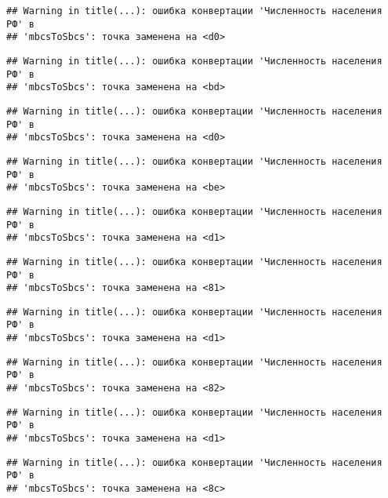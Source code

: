 \documentclass[
]{article}
\begin{document}
\begin{verbatim}
## Warning in title(...): ошибка конвертации 'Численность населения РФ' в
## 'mbcsToSbcs': точка заменена на <d0>
\end{verbatim}

\begin{verbatim}
## Warning in title(...): ошибка конвертации 'Численность населения РФ' в
## 'mbcsToSbcs': точка заменена на <bd>
\end{verbatim}

\begin{verbatim}
## Warning in title(...): ошибка конвертации 'Численность населения РФ' в
## 'mbcsToSbcs': точка заменена на <d0>
\end{verbatim}

\begin{verbatim}
## Warning in title(...): ошибка конвертации 'Численность населения РФ' в
## 'mbcsToSbcs': точка заменена на <be>
\end{verbatim}

\begin{verbatim}
## Warning in title(...): ошибка конвертации 'Численность населения РФ' в
## 'mbcsToSbcs': точка заменена на <d1>
\end{verbatim}

\begin{verbatim}
## Warning in title(...): ошибка конвертации 'Численность населения РФ' в
## 'mbcsToSbcs': точка заменена на <81>
\end{verbatim}

\begin{verbatim}
## Warning in title(...): ошибка конвертации 'Численность населения РФ' в
## 'mbcsToSbcs': точка заменена на <d1>
\end{verbatim}

\begin{verbatim}
## Warning in title(...): ошибка конвертации 'Численность населения РФ' в
## 'mbcsToSbcs': точка заменена на <82>
\end{verbatim}

\begin{verbatim}
## Warning in title(...): ошибка конвертации 'Численность населения РФ' в
## 'mbcsToSbcs': точка заменена на <d1>
\end{verbatim}

\begin{verbatim}
## Warning in title(...): ошибка конвертации 'Численность населения РФ' в
## 'mbcsToSbcs': точка заменена на <8c>
\end{verbatim}
\end{document}
